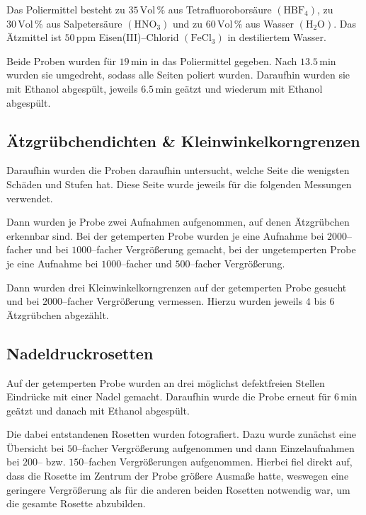 \documentclass[12pt,a4paper]{scrartcl}
\numberwithin{equation}{section} %
\begin{document}
Das Poliermittel besteht zu $35\,\mathrm{Vol\,\%}$ aus Tetrafluoroborsäure $(\mathrm{HBF_4})$, zu $30\,\mathrm{Vol\,\%}$ aus Salpetersäure $(\mathrm{HNO_3})$ und zu $60\,\mathrm{Vol\,\%}$ aus Wasser $(\mathrm{H_2O})$. Das Ätzmittel ist $50\,\mathrm{ppm}$ Eisen(III)--Chlorid $(\mathrm{FeCl_3})$ in destiliertem Wasser.

Beide Proben wurden für $19\mathrm{\,min}$ in das Poliermittel gegeben. Nach $13.5\mathrm{\,min}$ wurden sie umgedreht, sodass alle Seiten poliert wurden. Daraufhin wurden sie mit Ethanol abgespült, jeweils $6.5\mathrm{\,min}$ geätzt und wiederum mit Ethanol abgespült.

\hypertarget{uxe4tzgruxfcbchendichten-kleinwinkelkorngrenzen}{%
\subsection{Ätzgrübchendichten \&
Kleinwinkelkorngrenzen}\label{uxe4tzgruxfcbchendichten-kleinwinkelkorngrenzen}}

Daraufhin wurden die Proben daraufhin untersucht, welche Seite die wenigsten Schäden und Stufen hat. Diese Seite wurde jeweils für die folgenden Messungen verwendet.

Dann wurden je Probe zwei Aufnahmen aufgenommen, auf denen Ätzgrübchen erkennbar sind. Bei der getemperten Probe wurden je eine Aufnahme bei $2000$--facher und bei $1000$--facher Vergrößerung gemacht, bei der ungetemperten Probe je eine Aufnahme bei $1000$--facher und $500$--facher Vergrößerung.

Dann wurden drei Kleinwinkelkorngrenzen auf der getemperten Probe gesucht und bei $2000$--facher Vergrößerung vermessen. Hierzu wurden jeweils $4$ bis $6$ Ätzgrübchen abgezählt.

\hypertarget{nadeldruckrosetten}{%
\subsection{Nadeldruckrosetten}\label{nadeldruckrosetten}}

Auf der getemperten Probe wurden an drei möglichst defektfreien Stellen Eindrücke mit einer Nadel gemacht. Daraufhin wurde die Probe erneut für $6\mathrm{\,min}$ geätzt und danach mit Ethanol abgespült.

Die dabei entstandenen Rosetten wurden fotografiert. Dazu wurde zunächst eine Übersicht bei $50$--facher Vergrößerung aufgenommen und dann Einzelaufnahmen bei $200$-- bzw. $150$--fachen Vergrößerungen aufgenommen. Hierbei fiel direkt auf, dass die Rosette im Zentrum der Probe größere Ausmaße hatte, weswegen eine geringere Vergrößerung als für die anderen beiden Rosetten notwendig war, um die gesamte Rosette abzubilden.
\end{document}
